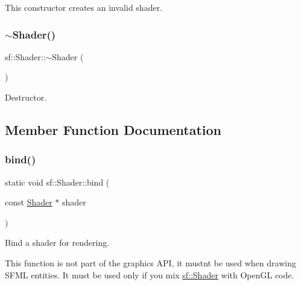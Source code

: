 This constructor creates an invalid shader. \begin{DoxyVerb}\end{DoxyVerb}
 \mbox{\label{classsf_1_1_shader_a4bac6cc8b046ecd8fb967c145a2380e6}} 
\subsubsection{\texorpdfstring{$\sim$Shader()}{~Shader()}}
{\footnotesize\ttfamily sf\+::\+Shader\+::$\sim$\+Shader (\begin{DoxyParamCaption}{ }\end{DoxyParamCaption})}



Destructor. 

\begin{DoxyVerb}\end{DoxyVerb}
 

\subsection{Member Function Documentation}
\mbox{\label{classsf_1_1_shader_a09778f78afcbeb854d608c8dacd8ea30}} 
\subsubsection{\texorpdfstring{bind()}{bind()}}
{\footnotesize\ttfamily static void sf\+::\+Shader\+::bind (\begin{DoxyParamCaption}\item[{const \mbox{\hyperlink{classsf_1_1_shader}{Shader}} $\ast$}]{shader }\end{DoxyParamCaption})\hspace{0.3cm}{\ttfamily [static]}}



Bind a shader for rendering. 

This function is not part of the graphics A\+PI, it mustn\textquotesingle{}t be used when drawing S\+F\+ML entities. It must be used only if you mix \mbox{\hyperlink{classsf_1_1_shader}{sf\+::\+Shader}} with Open\+GL code.


\begin{DoxyCode}{0}
\DoxyCodeLine{\textcolor{comment}{// draw OpenGL stuff that use s1...}}
\DoxyCodeLine{\textcolor{comment}{// draw OpenGL stuff that use s2...}}
\DoxyCodeLine{\textcolor{comment}{// draw OpenGL stuff that use no shader...}}
\end{DoxyCode}



